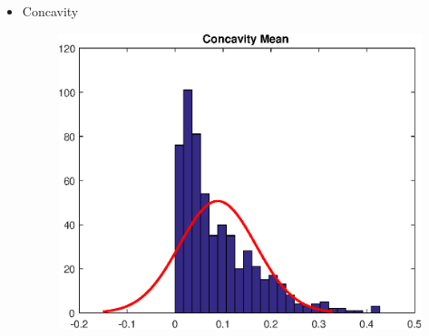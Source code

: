 \documentclass[11pt,a4paper]{article}
\numberwithin{equation}{section}
\begin{document}
\begin{itemize}
\item Concavity
\begin{figure}[H]
\centering
  \includegraphics[width=.5\linewidth]{./img/concavity_mean}
  \label{fig:test1}
\end{figure}%


\end{itemize}
\end{document}
